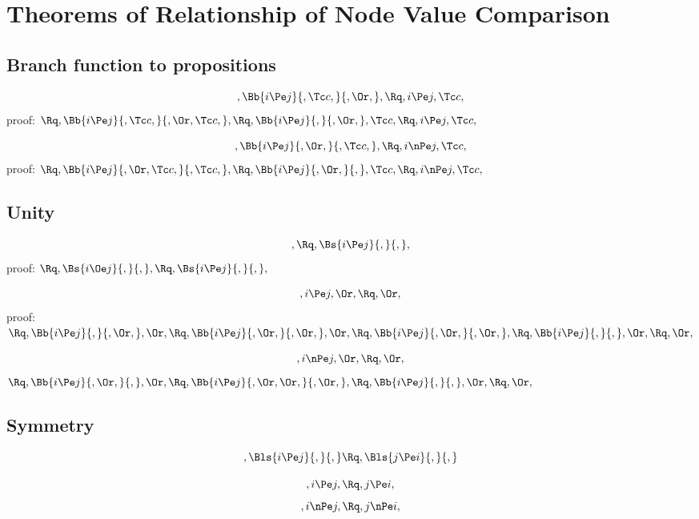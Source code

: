
 \chapter{Theorems of Relationship of Node Value Comparison}
 \section{Branch function to propositions}
 \[, \Bb{i  \Pe j}{, \Tc c,}{, \Or,},  \Rq ,i  \Pe j,  \Tc c, \]
 proof:
 \begin{math}
    \Rq, \Bb{i  \Pe j}{, \Tc c,}{, \Or, \Tc c,},
    \Rq, \Bb{i  \Pe j}{,}{, \Or,}, \Tc c,
    \Rq, i  \Pe j, \Tc c,
 \end{math}

 \[, \Bb{i  \Pe j}{, \Or,}{, \Tc c,},  \Rq ,i  \nPe j,  \Tc c, \]
 proof:
 \begin{math}
    \Rq, \Bb{i  \Pe j}{, \Or,  \Tc c,}{, \Tc c,},
    \Rq, \Bb{i  \Pe j}{, \Or,}{,}, \Tc c,
    \Rq, i  \nPe j,  \Tc c,
 \end{math}

 \section{Unity}
 \[,  \Rq ,  \Bs{i  \Pe j}{,}{,}, \]
 proof:
 \begin{math}
    \Rq , \Bs{i  \Oe j}{,}{,}, 
    \Rq , \Bs{i  \Pe j}{,}{,},
 \end{math}

 \[, i  \Pe j,  \Or,  \Rq ,  \Or, \]
proof:  \\
\begin{math} 
 \Rq, \Bb{i  \Pe j}{,}{, \Or,},  \Or, 
 \Rq, \Bb{i  \Pe j}{,\Or, }{, \Or,},  \Or, 
 \Rq, \Bb{i  \Pe j}{,\Or,}{,\Or,},
 \Rq, \Bb{i  \Pe j}{,}{,},\Or,
 \Rq, \Or,
\end{math}


 \[, i  \nPe j,  \Or,  \Rq ,  \Or, \]
 \begin{math} 
   \Rq, \Bb{i  \Pe j}{, \Or,}{,},  \Or, 
   \Rq, \Bb{i  \Pe j}{, \Or, \Or,}{, \Or,},  
   \Rq, \Bb{i  \Pe j}{,}{,}, \Or,
   \Rq, \Or,
\end{math}

 \section{Symmetry}
 \[,  \Bls{i \Pe j}{,}{,}  \Rq ,  \Bls{j  \Pe i}{,}{,}  \]

 \[, i  \Pe j,  \Rq , j  \Pe i, \]
 \[, i  \nPe j,  \Rq , j  \nPe i, \]



